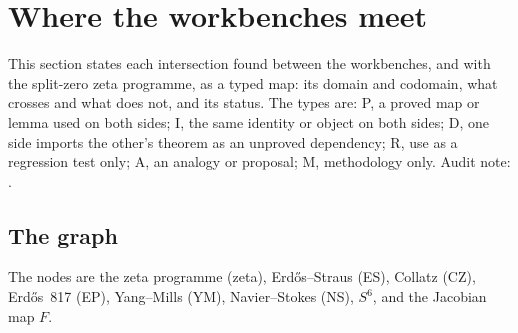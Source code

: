 \section{Where the workbenches meet}\label{sec:intersections}

This section states each intersection found between the workbenches, and with the split-zero zeta programme, as a typed map: its domain and codomain, what crosses and what does not, and its status. The types are: \textsf{P}, a proved map or lemma used on both sides; \textsf{I}, the same identity or object on both sides; \textsf{D}, one side imports the other's theorem as an unproved dependency; \textsf{R}, use as a regression test only; \textsf{A}, an analogy or proposal; \textsf{M}, methodology only. Audit note: .

\subsection{The graph}

The nodes are the zeta programme (zeta), Erdős--Straus (ES), Collatz (CZ), Erdős~817 (EP), Yang--Mills (YM), Navier--Stokes (NS), $S^6$, and the Jacobian map $F$.

